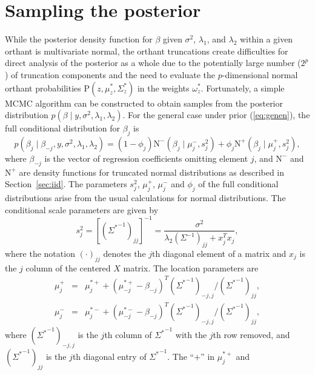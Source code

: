 \documentclass[12pt]{article}
\begin{document}
\section{Sampling the posterior}\label{sec:mcmc}
While the posterior density function for $\beta$ given $\sigma^2$, $\lambda_1$, and $\lambda_2$
within a given orthant is multivariate normal, the 
orthant truncations create difficulties for direct analysis of the posterior as a whole due to
the potentially large number ($2^p$) of truncation components and the need to evaluate the
$p$-dimensional normal orthant probabilities $\mbox{P}(z, \mu^*_z, \Sigma^*_z)$ in the weights
$\omega^*_z$.  Fortunately, a simple MCMC algorithm can be constructed to obtain samples from
the posterior distribution $p(\beta \mid y, \sigma^2, \lambda_1, \lambda_2)$.  For the general
case under prior (\ref{eq:genen}), the full conditional distribution for $\beta_j$ is
\begin{equation}
	p(\beta_j \mid \beta_{-j}, y, \sigma^2, \lambda_1, \lambda_2) = (1-\phi_j) \mbox{N}^{-}
		(\beta_j \mid \mu_j^-, s^2_j) + \phi_j \mbox{N}^+(\beta_j \mid \mu_j^+, s^2_j),
		\label{eq:fullcon}
\end{equation}
where $\beta_{-j}$ is the vector of regression coefficients omitting element $j$, and $\mbox{N}^-$
and $\mbox{N}^+$ are density functions for truncated normal distributions as described
in Section~\ref{sec:iid}. The parameters $s^2_j$,
$\mu^+_j$, $\mu^-_j$ and $\phi_j$ of
the full conditional distributions arise from the usual calculations for normal distributions.  The conditional
scale parameters are given by
\[
	s^2_j = [ ({\Sigma^*}^{-1})_{jj}]^{-1} = \frac{\sigma^2}{\lambda_2 (\Sigma^{-1})_{jj} + x_j^T x_j},
\]
where the notation $(\cdot)_{jj}$ denotes the $j$th diagonal element of a matrix and $x_j$ is the 
$j$ column of the centered $X$ matrix.
The location parameters are
\begin{eqnarray}
	\mu^+_j &=& \mu^{*+}_j+ (\mu^{*+}_{-j} - \beta_{-j})^T ({\Sigma^*}^{-1})_{-j,j} / ({\Sigma^*}^{-1})_{jj}, 
		\label{eq:mupgen} \\
	\mu^-_j &=& \mu^{*-}_j+ (\mu^{*-}_{-j} - \beta_{-j})^T ({\Sigma^*}^{-1})_{-j,j} / ({\Sigma^*}^{-1})_{jj},
		\label{eq:mumgen}
\end{eqnarray}
where $({\Sigma^*}^{-1})_{-j,j}$ is the $j$th column of ${\Sigma^*}^{-1}$ with the $j$th row removed, and
$({\Sigma^*}^{-1})_{jj}$ is the $j$th diagonal entry of ${\Sigma^*}^{-1}$.  The ``$+$'' in $\mu^{*+}_j$ and
\end{document}
